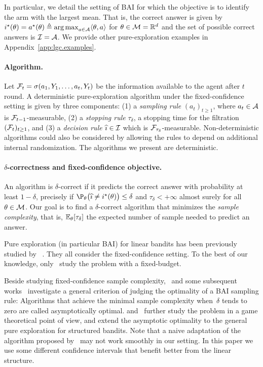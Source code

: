 In particular, we detail the setting of BAI for which the objective is to identify the arm with the largest mean. That is, the correct answer is given by $i^\star(\theta)=a^\star(\theta)\triangleq \operatorname*{arg\,max}_{a\in\mathcal{A}} \langle\theta,a\rangle$ for $\theta\in\mathcal{M} = \mathbb{R}^d$ and the set of possible correct answers is $\mathcal{I} = \mathcal{A}$. We provide other pure-exploration examples in Appendix~\ref{app:lgc.examples}.

\paragraph{Algorithm.}
Let $\mathcal{F}_{t}=\sigma (a_1,Y_1,\ldots, a_t,Y_t)$ be the information available to the agent after $t$ round. A deterministic pure-exploration algorithm under the fixed-confidence setting is given by three components: (1) a \emph{sampling rule} $(a_t)_{t\geq 1}$, where $a_t\in\mathcal{A}$ is $\mathcal{F}_{t-1}$-measurable, (2) a \emph{stopping rule} $\tau_\delta$, a stopping time for the filtration $(\mathcal{F}_t)_{t\geq 1}$, and (3) a \emph{decision rule} $\widehat{\imath}\in \mathcal{I}$ which is $\mathcal{F}_{\tau_\delta}$-measurable.
Non-deterministic algorithms could also be considered by allowing the rules to depend on additional internal randomization. The algorithms we present are deterministic.

\paragraph{$\delta$-correctness and fixed-confidence objective.}
An algorithm is $\delta$-correct if it predicts the correct answer with probability at least $1-\delta$, precisely if $\P_\theta \big(\hi \neq \istar(\theta)\big) \leq \delta$ and $\tau_\delta < +\infty$ almost surely for all $\theta \in\mathcal{M}$. Our goal is to find a $\delta$-correct algorithm that minimizes the \emph{sample complexity}, that is,  $\mathbb{E}_\theta[\tau_\delta]$ the expected number of sample needed to predict an answer.

Pure exploration (in particular BAI) for linear bandits has been previously studied by
~\citet{soare2014linear,tao2018alba,xu2018linear,zaki2019maxoverlap,fiez2019transductive,kazerouni2019glb}. They all consider the fixed-confidence setting. To the best of our knowledge, only~\citet{hoffman2014bayesgap} study the problem with a fixed-budget.

Beside studying fixed-confidence sample complexity,~\citet{garivier2016tracknstop} and some subsequent works~\citep{qin2017ttei,shang2020t3c} investigate a general criterion of judging the optimality of a BAI sampling rule: Algorithms that achieve the minimal sample complexity when~$\delta$ tends to zero are called asymptotically optimal. \citet{menard2019lma} and~\citet{degenne2019game} further study the problem in a game theoretical point of view, and extend the asymptotic optimality to the general pure exploration for structured bandits. Note that a naive adaptation of the algorithm proposed by~\citet{degenne2019game} may not work smoothly in our setting. In this paper we use some different confidence intervals that benefit better from the linear structure.

